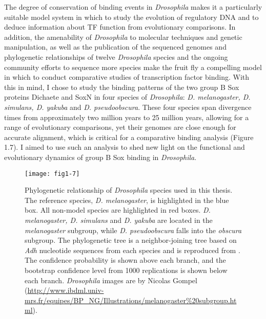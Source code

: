 The degree of conservation of binding events in \emph{Drosophila} makes it a particularly suitable model system in which to study the evolution of regulatory DNA and to deduce information about TF function from evolutionary comparisons. In addition, the amenability of \emph{Drosophila} to molecular techniques and genetic manipulation, as well as the publication of the sequenced genomes and phylogenetic relationships of twelve \emph{Drosophila} species \citep{clark_evolution_2007} and the ongoing community efforts to sequence more species make the fruit fly a compelling model in which to conduct comparative studies of transcription factor binding. With this in mind, I chose to study the binding patterns of the two group B Sox proteins Dichaete and SoxN in four species of \emph{Drosophila}: \emph{D. melanogaster, D. simulans, D. yakuba} and \emph{D. pseudoobscura}. These four species span divergence times from approximately two million years to 25 million years, allowing for a range of evolutionary comparisons, yet their genomes are close enough for accurate alignment, which is critical for a comparative binding analysis \citep{russo_molecular_1995} (Figure 1.7). I aimed to use such an analysis to shed new light on the functional and evolutionary dynamics of group B Sox binding in \emph{Drosophila}.

\begin{figure}
\centering
\texttt{[image: fig1-7]}
\caption[Phylogenetic relationship of \emph{Drosophila} species used in this thesis]{Phylogenetic relationship of \emph{Drosophila} species used in this thesis. The reference species, \emph{D. melanogaster}, is highlighted in the blue box. All non-model species are highlighted in red boxes. \emph{D. melanogaster, D. simulans} and \emph{D. yakuba} are located in the \emph{melanogaster} subgroup, while \emph{D. pseudoobscura} falls into the \emph{obscura} subgroup. The phylogenetic tree is a neighbor-joining tree based on \emph{Adh} nucleotide sequences from each species and is reproduced from \citet{russo_molecular_1995}. The confidence probability is shown above each branch, and the bootstrap confidence level from 1000 replications is shown below each branch. \emph{Drosophila} images are by Nicolas Gompel (\url{http://www.ibdml.univ-mrs.fr/equipes/BP_NG/Illustrations/melanogaster\%20subgroup.html}).}
\label{Figure 1.7}
\end{figure}

